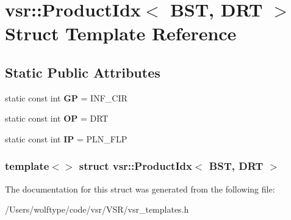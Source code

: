\hypertarget{structvsr_1_1_product_idx_3_01_b_s_t_00_01_d_r_t_01_4}{\section{vsr\-:\-:Product\-Idx$<$ B\-S\-T, D\-R\-T $>$ Struct Template Reference}
\label{structvsr_1_1_product_idx_3_01_b_s_t_00_01_d_r_t_01_4}
}
\subsection*{Static Public Attributes}
\begin{DoxyCompactItemize}
\item 
\hypertarget{structvsr_1_1_product_idx_3_01_b_s_t_00_01_d_r_t_01_4_ac59c2dc74d888758b2fff658ecb86931}{static const int {\bfseries G\-P} = I\-N\-F\-\_\-\-C\-I\-R}\label{structvsr_1_1_product_idx_3_01_b_s_t_00_01_d_r_t_01_4_ac59c2dc74d888758b2fff658ecb86931}

\item 
\hypertarget{structvsr_1_1_product_idx_3_01_b_s_t_00_01_d_r_t_01_4_a0b093ac6fc0d1364b2e074ffe9aa5cc2}{static const int {\bfseries O\-P} = D\-R\-T}\label{structvsr_1_1_product_idx_3_01_b_s_t_00_01_d_r_t_01_4_a0b093ac6fc0d1364b2e074ffe9aa5cc2}

\item 
\hypertarget{structvsr_1_1_product_idx_3_01_b_s_t_00_01_d_r_t_01_4_a5a6160db1beb5e36b89eb79b0f62cd58}{static const int {\bfseries I\-P} = P\-L\-N\-\_\-\-F\-L\-P}\label{structvsr_1_1_product_idx_3_01_b_s_t_00_01_d_r_t_01_4_a5a6160db1beb5e36b89eb79b0f62cd58}

\end{DoxyCompactItemize}
\subsubsection*{template$<$$>$ struct vsr\-::\-Product\-Idx$<$ B\-S\-T, D\-R\-T $>$}



The documentation for this struct was generated from the following file\-:\begin{DoxyCompactItemize}
\item 
/\-Users/wolftype/code/vsr/\-V\-S\-R/vsr\-\_\-templates.\-h\end{DoxyCompactItemize}
